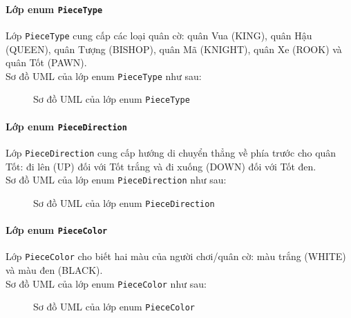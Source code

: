 \paragraph{Lớp enum \lstinline{PieceType}}
Lớp \lstinline{PieceType} cung cấp các loại quân cờ: quân Vua (KING), quân Hậu (QUEEN), quân Tượng (BISHOP), quân Mã (KNIGHT), quân Xe (ROOK) và quân Tốt (PAWN).\\
Sơ đồ UML của lớp enum \lstinline{PieceType} như sau:
\begin{figure}[H]
\caption{Sơ đồ UML của lớp enum \lstinline{PieceType}}
\end{figure}

\paragraph{Lớp enum \lstinline{PieceDirection}}
Lớp \lstinline{PieceDirection} cung cấp hướng di chuyển thẳng về phía trước cho quân Tốt: đi lên (UP) đối với Tốt trắng và đi xuống (DOWN) đối với Tốt đen.\\
Sơ đồ UML của lớp enum \lstinline{PieceDirection} như sau:
\begin{figure}[H]
\caption{Sơ đồ UML của lớp enum \lstinline{PieceDirection}}
\end{figure}

\paragraph{Lớp enum \lstinline{PieceColor}}
Lớp \lstinline{PieceColor} cho biết hai màu của người chơi/quân cờ: màu trắng (WHITE) và màu đen (BLACK).\\
Sơ đồ UML của lớp enum \lstinline{PieceColor} như sau:
\begin{figure}[H]
\caption{Sơ đồ UML của lớp enum \lstinline{PieceColor}}
\end{figure}

